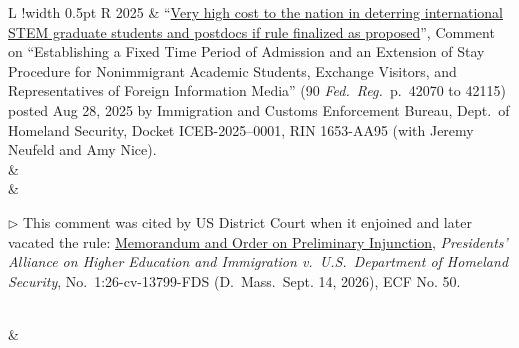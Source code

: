 \documentclass[10pt]{article}
\newcommand\VRule{\color{lightgray}\vrule width 0.5pt}
\begin{document}
\begin{longtable}{L !{\VRule}  R}
		2025 & ``\href{https://www.regulations.gov/comment/ICEB-2025-0001-16581}{Very high cost to the nation in deterring international STEM graduate students and postdocs if rule
			finalized as proposed}'', Comment on ``Establishing a Fixed Time Period of Admission and an Extension of Stay Procedure for Nonimmigrant Academic Students, Exchange Visitors, and Representatives of Foreign Information Media'' (90 \textit{Fed.\ Reg.\ }p.\ 42070 to 42115) posted Aug 28, 2025 by Immigration and Customs Enforcement Bureau, Dept.\ of Homeland Security, Docket ICEB-2025–0001, RIN 1653-AA95 (with Jeremy Neufeld and Amy Nice). \\
	&\\[-1.85ex]
	& \phantom{xxxx} \begin{minipage}{5in} $\triangleright$ This comment was cited by US District Court when it enjoined and later vacated the rule: \href{https://storage.courtlistener.com/recap/gov.uscourts.mad.305059/gov.uscourts.mad.305059.50.0_3.pdf}{Memorandum and Order on Preliminary Injunction}, \textit{Presidents' Alliance on Higher Education and Immigration v.\ U.S.\ Department of Homeland Security}, No.\ 1:26-cv-13799-FDS (D.\ Mass.\ Sept. 14, 2026), ECF No. 50.\end{minipage} \\
	&\\[-1ex]
	

	
\end{longtable}




 
\end{document}
